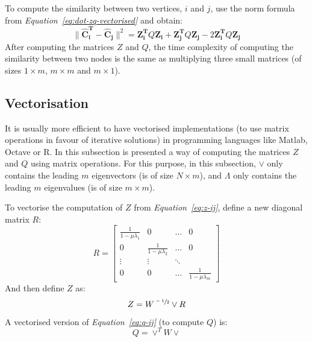 \documentclass[12pt]{report}
\begin{document}
To compute the similarity between two vertices, $i$ and $j$, use the norm formula
from \emph{Equation~\ref{eq:dot-zq-vectorised}} and obtain:
%
\begin{equation}
\|\mathbf{\hat{C}_i^T} - \mathbf{\hat{C}_j}\|^2 = \mathbf{Z_i^T} Q \mathbf{Z_i} + \mathbf{Z_j^T} Q \mathbf{Z_j} - 2 \mathbf{Z_i^T} Q \mathbf{Z_j}
\end{equation}
%
After computing the matrices $Z$ and $Q$, the time complexity of computing the
similarity between two nodes is the same as multiplying three small matrices
(of sizes $1 \times m$, $m \times m$ and $m \times 1$).


\subsection{Vectorisation}
It is usually more efficient to have vectorised implementations (to use matrix
operations in favour of iterative solutions) in programming languages like Matlab,
Octave or R. In this subsection is presented a way of computing the matrices $Z$
and $Q$ using matrix operations. For this purpose, in this subsection, $\vee$ only
contains the leading $m$ eigenvectors (is of size $N \times m$), and $\Lambda$ only
contains the leading $m$ eigenvalues (is of size $m \times m$).


%
%
To vectorise the computation of $Z$ from \emph{Equation~\ref{eq:z-ij}}, define a
new diagonal matrix $R$:
%
\begin{equation}
R = \begin{bmatrix}
\frac{1}{1 - \mu \lambda_1} & 0  & \dots & 0 \\
0 & \frac{1}{1 - \mu \lambda_2}  & \dots & 0 \\
\vdots & \vdots & \ddots & \\
0 & 0 & \dots & \frac{1}{1 - \mu \lambda_m}
\end{bmatrix}
\end{equation}
And then define $Z$ as:
\begin{equation}
Z = W^{\sfrac{-1}{2}} \vee R
\end{equation}
%
%
A vectorised version of \emph{Equation~\ref{eq:q-ij}} (to compute $Q$) is:
\begin{equation}
Q = \vee^T W \vee
\end{equation}


%
\end{document}
